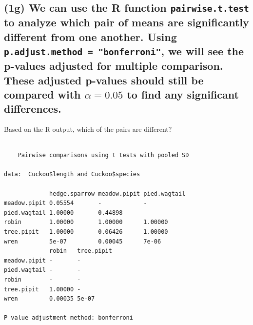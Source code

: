 \documentclass[
]{book}
\newenvironment{Shaded}{\begin{snugshade}}{\end{snugshade}}
\newcommand{\AttributeTok}[1]{\textcolor[rgb]{0.77,0.63,0.00}{#1}}
\newcommand{\FunctionTok}[1]{\textcolor[rgb]{0.00,0.00,0.00}{#1}}
\newcommand{\NormalTok}[1]{#1}
\newcommand{\SpecialCharTok}[1]{\textcolor[rgb]{0.00,0.00,0.00}{#1}}
\newcommand{\StringTok}[1]{\textcolor[rgb]{0.31,0.60,0.02}{#1}}
\begin{document}
\hypertarget{g-we-can-use-the-r-function-pairwise.t.test-to-analyze-which-pair-of-means-are-significantly-different-from-one-another.-using-p.adjust.method-bonferroni-we-will-see-the-p-values-adjusted-for-multiple-comparison.-these-adjusted-p-values-should-still-be-compared-with-alpha-0.05-to-find-any-significant-differences.}{%
\subsection{\texorpdfstring{(1g) We can use the R function \texttt{pairwise.t.test} to analyze which pair of means are significantly different from one another. Using \texttt{p.adjust.method\ =\ "bonferroni"}, we will see the p-values adjusted for multiple comparison. These adjusted p-values should still be compared with \(\alpha = 0.05\) to find any significant differences.}{(1g) We can use the R function pairwise.t.test to analyze which pair of means are significantly different from one another. Using p.adjust.method = "bonferroni", we will see the p-values adjusted for multiple comparison. These adjusted p-values should still be compared with \textbackslash alpha = 0.05 to find any significant differences.}}\label{g-we-can-use-the-r-function-pairwise.t.test-to-analyze-which-pair-of-means-are-significantly-different-from-one-another.-using-p.adjust.method-bonferroni-we-will-see-the-p-values-adjusted-for-multiple-comparison.-these-adjusted-p-values-should-still-be-compared-with-alpha-0.05-to-find-any-significant-differences.}}

Based on the R output, which of the pairs are different?

\begin{Shaded}
\end{Shaded}

\begin{verbatim}

    Pairwise comparisons using t tests with pooled SD 

data:  Cuckoo$length and Cuckoo$species 

             hedge.sparrow meadow.pipit pied.wagtail
meadow.pipit 0.05554       -            -           
pied.wagtail 1.00000       0.44898      -           
robin        1.00000       1.00000      1.00000     
tree.pipit   1.00000       0.06426      1.00000     
wren         5e-07         0.00045      7e-06       
             robin   tree.pipit
meadow.pipit -       -         
pied.wagtail -       -         
robin        -       -         
tree.pipit   1.00000 -         
wren         0.00035 5e-07     

P value adjustment method: bonferroni 
\end{verbatim}
\end{document}
